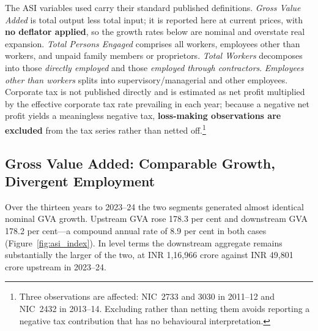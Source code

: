 \documentclass[11pt, a4paper]{article}
\numberwithin{figure}{section}
\numberwithin{table}{section}
\begin{document}
The ASI variables used carry their standard published definitions. \textit{Gross Value Added} is total output less total input; it is reported here at current prices, with \textbf{no deflator applied}, so the growth rates below are nominal and overstate real expansion. \textit{Total Persons Engaged} comprises all workers, employees other than workers, and unpaid family members or proprietors. \textit{Total Workers} decomposes into those \textit{directly employed} and those \textit{employed through contractors}. \textit{Employees other than workers} splits into supervisory/managerial and other employees. Corporate tax is not published directly and is estimated as net profit multiplied by the effective corporate tax rate prevailing in each year; because a negative net profit yields a meaningless negative tax, \textbf{loss-making observations are excluded} from the tax series rather than netted off.\footnote{Three observations are affected: NIC~2733 and 3030 in 2011--12 and NIC~2432 in 2013--14. Excluding rather than netting them avoids reporting a negative tax contribution that has no behavioural interpretation.}

\subsection{Gross Value Added: Comparable Growth, Divergent Employment}
Over the thirteen years to 2023--24 the two segments generated almost identical nominal GVA growth. Upstream GVA rose 178.3 per cent and downstream GVA 178.2 per cent---a compound annual rate of 8.9 per cent in both cases (Figure~\ref{fig:asi_index}). In level terms the downstream aggregate remains substantially the larger of the two, at INR 1,16,966 crore against INR 49,801 crore upstream in 2023--24.
\end{document}
